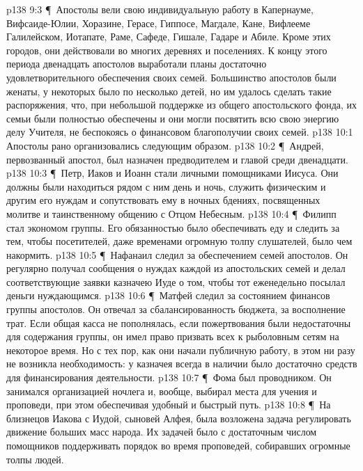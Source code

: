 \vs p138 9:3 \P\ Апостолы вели свою индивидуальную работу в Капернауме, Вифсаиде\hyp{}Юлии, Хоразине, Герасе, Гиппосе, Магдале, Кане, Вифлееме Галилейском, Иотапате, Раме, Сафеде, Гишале, Гадаре и Абиле. Кроме этих городов, они действовали во многих деревнях и поселениях. К концу этого периода двенадцать апостолов выработали планы достаточно удовлетворительного обеспечения своих семей. Большинство апостолов были женаты, у некоторых было по несколько детей, но им удалось сделать такие распоряжения, что, при небольшой поддержке из общего апостольского фонда, их семьи были полностью обеспечены и они могли посвятить всю свою энергию делу Учителя, не беспокоясь о финансовом благополучии своих семей.
\vs p138 10:1 Апостолы рано организовались следующим образом.
\vs p138 10:2 \P\ \bibnobreakspace Андрей, первозванный апостол, был назначен предводителем и главой среди двенадцати.
\vs p138 10:3 \P\ \bibnobreakspace Петр, Иаков и Иоанн стали личными помощниками Иисуса. Они должны были находиться рядом с ним день и ночь, служить физическим и другим его нуждам и сопутствовать ему в ночных бдениях, посвященных молитве и таинственному общению с Отцом Небесным.
\vs p138 10:4 \P\ \bibnobreakspace Филипп стал экономом группы. Его обязанностью было обеспечивать еду и следить за тем, чтобы посетителей, даже временами огромную толпу слушателей, было чем накормить.
\vs p138 10:5 \P\ \bibnobreakspace Нафанаил следил за обеспечением семей апостолов. Он регулярно получал сообщения о нуждах каждой из апостольских семей и делал соответствующие заявки казначею Иуде о том, чтобы тот еженедельно посылал деньги нуждающимся.
\vs p138 10:6 \P\ \bibnobreakspace Матфей следил за состоянием финансов группы апостолов. Он отвечал за сбалансированность бюджета, за восполнение трат. Если общая касса не пополнялась, если пожертвования были недостаточны для содержания группы, он имел право призвать всех к рыболовным сетям на некоторое время. Но с тех пор, как они начали публичную работу, в этом ни разу не возникла необходимость: у казначея всегда в наличии было достаточно средств для финансирования деятельности.
\vs p138 10:7 \P\ \bibnobreakspace Фома был проводником. Он занимался организацией ночлега и, вообще, выбирал места для учения и проповеди, при этом обеспечивая удобный и быстрый путь.
\vs p138 10:8 \P\ \bibnobreakspace На близнецов Иакова с Иудой, сыновей Алфея, была возложена задача регулировать движение больших масс народа. Их задачей было с достаточным числом помощников поддерживать порядок во время проповедей, собиравших огромные толпы людей.
